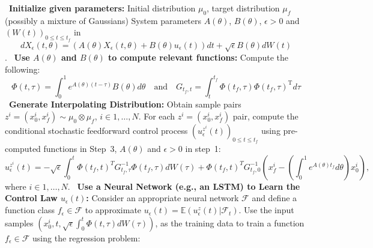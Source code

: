 \documentclass[12pt]{amsart}
\renewcommand{\(}{\left (}
\renewcommand{\)}{\right )}
\numberwithin{equation}{section}
\begin{document}
\begin{algorithm}[H]
\caption{Flow Matching for Stochastic Averaged Systems (Product Coupling)}
\label{alg:flow_matching}
\begin{algorithmic}[1]
 \Statex \textbullet~\textbf{Initialize given parameters:} 
\State Initial distribution $\mu_0$, target distribution $\mu_f$ (possibly a mixture of Gaussians)
\State System parameters $A(\theta)$, $B(\theta)$, $\epsilon> 0$ and $(W(t))_{0\leq t\leq t_f}$ in $$d X_{\epsilon}(t,\theta)=(A(\theta)X_{\epsilon}(t,\theta)+B(\theta)u_{\epsilon}(t))d t+\sqrt{\epsilon}B(\theta)d W(t)$$.
\Statex \textbullet~\textbf{Use $A(\theta)$ and $B(\theta)$ to compute relevant functions:}
\State Compute the following:
         \begin{equation*}
        \Phi(t,\tau) =\int_0^1e^{A(\theta)(t-\tau)}B(\theta)d\theta\quad\text{and}\quad G_{t_f,t}=\int_{t}^{t_f}\Phi(t_f,\tau)\Phi(t_f,\tau)^{\mathrm{T}}d\tau
    \end{equation*}
 \Statex \textbullet~\textbf{Generate Interpolating Distribution:}
\State \hspace{\algorithmicindent} Obtain sample pairs $z^i = (x^i_0, x^i_f) \sim \mu_0 \otimes \mu_f$, $i \in {1, \dots, N}$. For each $z^i = (x^i_0, x^i_f)$ pair, compute
the conditional stochastic feedforward control process $(u_{\epsilon}^{z^i}(t))_{0\leq t\leq t_f}$ using pre-computed functions in Step~3, $A(\theta)$ and $\epsilon> 0$ in step~1:%
\begin{equation*}
  u_{\epsilon}^{z^i}(t)= -\sqrt{\epsilon}\int_0^t\Phi(t_f,t)^T G_{t_f,\tau}^{-1}\Phi(t_f,\tau) dW(\tau)+\Phi(t_f,t)^{T}G_{t_f,0}^{-1}\left(x^i_f-\left(\int_{0}^{1}e^{A(\theta)t_f}d\theta\right) x^i_0\right),   
 \end{equation*}
 where  $i \in {1, \dots, N}$.
\Statex \textbullet~\textbf{Use a Neural Network (e.g., an LSTM) to Learn the Control Law $u_{\epsilon}(t)$:}
\State \hspace{\algorithmicindent} %
Consider an appropriate neural network $\mathcal{F}$ and define a function class $f_{\epsilon}\in \mathcal{F}$ to approximate $u_{\epsilon}(t)=\mathbb{E}(u_{\epsilon}^z(t)|\mathcal{F}_t)$. Use the input samples $\left(x^i_0,t,\sqrt{\epsilon}\int_{0}^{t}\Phi(t,\tau) d W(\tau)\right)$, as the training data to train a function $f_{\epsilon} \in \mathcal{F}$ using the regression problem:

\end{algorithmic}
\end{algorithm}
\end{document}
